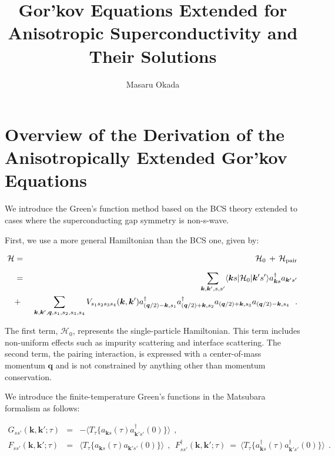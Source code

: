 \documentclass[uplatex,a4j,12pt,dvipdfmx]{jsarticle}
\title{
Gor'kov Equations Extended for Anisotropic Superconductivity and Their Solutions
}
\author{
Masaru Okada
}
\begin{document}
\maketitle

\section{Overview of the Derivation of the Anisotropically Extended Gor'kov Equations}

We introduce the Green's function method based on the BCS theory extended to cases where the superconducting gap symmetry is non-s-wave.

First, we use a more general Hamiltonian than the BCS one, given by:

\begin{eqnarray}
	\mathcal{H}
	&=&
	\mathcal{H}_{0} \ \! + \ \! \mathcal{H}_{\rm pair}
	\nonumber \\[2mm] &=&
	\sum_{\bm{k},\bm{k}',s,s'}
	\langle \bm{k} s | \mathcal{H}_{0} | \bm{k}' s' \rangle
	a_{\bm{k} s}^{\dagger}
	a_{\bm{k}' s'}
	\nonumber \\ \ &+& \
	\sum_{\bm{k},\bm{k}',\bm{q},s_{1},s_{2},s_{3},s_{4}}
	V_{s_{1}s_{2}s_{3}s_{4}}(\bm{k},\bm{k}')
	a_{(\bm{q}/2) - \bm{k} , s_{1}}^{\dagger}
	a_{(\bm{q}/2) + \bm{k} , s_{2}}^{\dagger}
	a_{(\bm{q}/2) + \bm{k} , s_{3}}
	a_{(\bm{q}/2) - \bm{k} , s_{4}}
	\ \ .
\end{eqnarray}

The first term, $\mathcal{H}_{0}$, represents the single-particle Hamiltonian. This term includes non-uniform effects such as impurity scattering and interface scattering. The second term, the pairing interaction, is expressed with a center-of-mass momentum $\bm{q}$ and is not constrained by anything other than momentum conservation.

We introduce the finite-temperature Green's functions in the Matsubara formalism as follows:

\begin{eqnarray}
	G_{ss'}(\bm{k} , \bm{k}' ; \tau)
	&=&
	-
	\langle T_{\tau} \{ a_{\bm{k}s}(\tau) a_{\bm{k}'s'}^{\dagger}(0) \} \rangle
	\ \ ,
	\\[3mm]
	F_{ss'}(\bm{k} , \bm{k}' ; \tau)
	&=&
	\langle T_{\tau} \{ a_{\bm{k}s}(\tau) a_{\bm{k}'s'}(0) \} \rangle
	\ \ , \ \
	F_{ss'}^{\dagger}(\bm{k} , \bm{k}' ; \tau)
	\ = \
	\langle T_{\tau} \{ a_{\bm{k}s}^{\dagger}(\tau) a_{\bm{k}'s'}^{\dagger}(0) \} \rangle
	\ \ .
\end{eqnarray}
\end{document}
